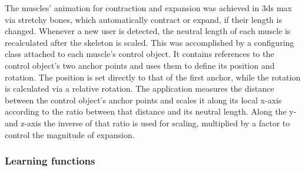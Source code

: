 The muscles' animation for contraction and expansion was achieved in 3ds max via stretchy bones, which automatically contract or expand, if their length is changed. 
Whenever a new user is detected, the neutral length of each muscle is recalculated after the skeleton is scaled.
This was accomplished by a configuring class attached to each muscle's control object. It contains references to the control object's two anchor points and uses them to define its position and rotation. The position is set directly to that of the first anchor, while the rotation is calculated via a relative rotation.
The application measures the distance between the control object's anchor points and scales it along its local x-axis according to the ratio between that distance and its neutral length. Along the y- and z-axis the inverse of that ratio is used for scaling, multiplied by a factor to control the magnitude of expansion. 

\subsubsection{Learning functions}
